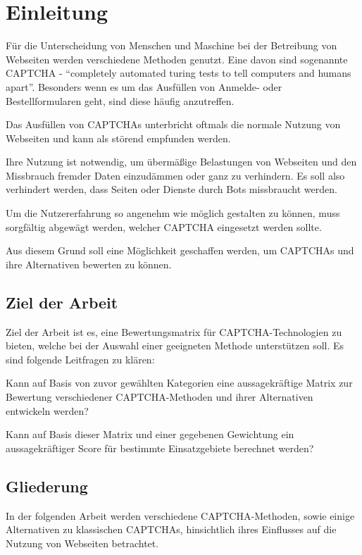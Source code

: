 \chapter{Einleitung}
\label{ch:intro}

Für die Unterscheidung von Menschen und Maschine bei der Betreibung von Webseiten werden verschiedene Methoden genutzt.
Eine davon sind sogenannte CAPTCHA - ``completely automated turing tests to tell computers and humans apart''.
Besonders wenn es um das Ausfüllen von Anmelde- oder Bestellformularen geht, sind diese häufig anzutreffen.

Das Ausfüllen von CAPTCHAs unterbricht oftmals die normale Nutzung von Webseiten und kann als störend empfunden werden.

Ihre Nutzung ist notwendig, um übermäßige Belastungen von Webseiten und den Missbrauch fremder Daten einzudämmen oder ganz zu verhindern.
Es soll also verhindert werden, dass Seiten oder Dienste durch Bots missbraucht werden.

Um die Nutzererfahrung so angenehm wie möglich gestalten zu können,
muss sorgfältig abgewägt werden, welcher CAPTCHA eingesetzt werden sollte. 

Aus diesem Grund soll eine Möglichkeit geschaffen werden, um CAPTCHAs und ihre Alternativen bewerten zu können.


%
%
\section{Ziel der Arbeit}
\label{sec:intro:goal}

Ziel der Arbeit ist es, eine Bewertungsmatrix für CAPTCHA-Technologien zu bieten, welche bei der Auswahl einer geeigneten Methode unterstützen soll.
Es sind folgende Leitfragen zu klären:

Kann auf Basis von zuvor gewählten Kategorien eine aussagekräftige Matrix zur
Bewertung verschiedener CAPTCHA-Methoden und ihrer Alternativen entwickeln werden?

Kann auf Basis dieser Matrix und einer gegebenen Gewichtung
ein aussagekräftiger Score für bestimmte Einsatzgebiete berechnet werden?

%
%
\section{Gliederung}
\label{sec:intro:structure}
In der folgenden Arbeit werden verschiedene CAPTCHA-Methoden, sowie einige Alternativen zu klassischen CAPTCHAs,
hinsichtlich ihres Einflusses auf die Nutzung von Webseiten betrachtet.

